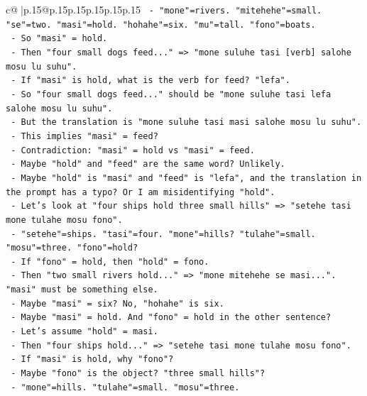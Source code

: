 \documentclass{article}
\begin{document}
{\begin{supertabular}{c@{$\;$}|p{.15\linewidth}@{}p{.15\linewidth}p{.15\linewidth}p{.15\linewidth}p{.15\linewidth}p{.15\linewidth}}
{{{\texttt{        {-} "mone"=rivers. "mitehehe"=small. "se"=two. "masi"=hold. "hohahe"=six. "mu"=tall. "fono"=boats.} \\
\texttt{        {-} So "masi" = hold.} \\
\texttt{        {-} Then "four small dogs feed..." => "mone suluhe tasi {[}verb{]} salohe mosu lu suhu".} \\
\texttt{        {-} If "masi" is hold, what is the verb for feed? "lefa".} \\
\texttt{        {-} So "four small dogs feed..." should be "mone suluhe tasi lefa salohe mosu lu suhu".} \\
\texttt{        {-} But the translation is "mone suluhe tasi masi salohe mosu lu suhu".} \\
\texttt{        {-} This implies "masi" = feed?} \\
\texttt{        {-} Contradiction: "masi" = hold vs "masi" = feed.} \\
\texttt{        {-} Maybe "hold" and "feed" are the same word? Unlikely.} \\
\texttt{        {-} Maybe "hold" is "masi" and "feed" is "lefa", and the translation in the prompt has a typo? Or I am misidentifying "hold".} \\
\texttt{        {-} Let's look at "four ships hold three small hills" => "setehe tasi mone tulahe mosu fono".} \\
\texttt{        {-} "setehe"=ships. "tasi"=four. "mone"=hills? "tulahe"=small. "mosu"=three. "fono"=hold?} \\
\texttt{        {-} If "fono" = hold, then "hold" = fono.} \\
\texttt{        {-} Then "two small rivers hold..." => "mone mitehehe se masi...". "masi" must be something else.} \\
\texttt{        {-} Maybe "masi" = six? No, "hohahe" is six.} \\
\texttt{        {-} Maybe "masi" = hold. And "fono" = hold in the other sentence?} \\
\texttt{        {-} Let's assume "hold" = masi.} \\
\texttt{        {-} Then "four ships hold..." => "setehe tasi mone tulahe mosu fono".} \\
\texttt{        {-} If "masi" is hold, why "fono"?} \\
\texttt{        {-} Maybe "fono" is the object? "three small hills"?} \\
\texttt{        {-} "mone"=hills. "tulahe"=small. "mosu"=three.} \\
}}}
\end{supertabular}}
\end{document}
